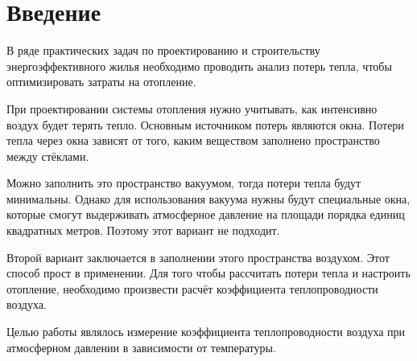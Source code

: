 \chapter{Введение}
\label{ch:intro}

    В ряде практических задач по проектированию и строительству энергоэффективного жилья необходимо проводить анализ потерь тепла, чтобы оптимизировать затраты на отопление.
    
    При проектировании системы отопления нужно учитывать, как интенсивно воздух будет терять тепло. Основным источником потерь являются окна. Потери тепла через окна зависят от того, каким веществом заполнено пространство между стёклами. 
    
    Можно заполнить это пространство вакуумом, тогда потери тепла будут минимальны. Однако для использования вакуума нужны будут специальные окна, которые смогут выдерживать атмосферное давление на площади порядка единиц квадратных метров. Поэтому этот вариант не подходит.
    
    Второй вариант заключается в заполнении этого пространства воздухом. Этот способ прост в применении. Для того чтобы рассчитать потери тепла и настроить отопление, необходимо произвести расчёт коэффициента теплопроводности воздуха.
    
    Целью работы являлось измерение коэффициента теплопроводности воздуха при атмосферном давлении в зависимости от температуры.
